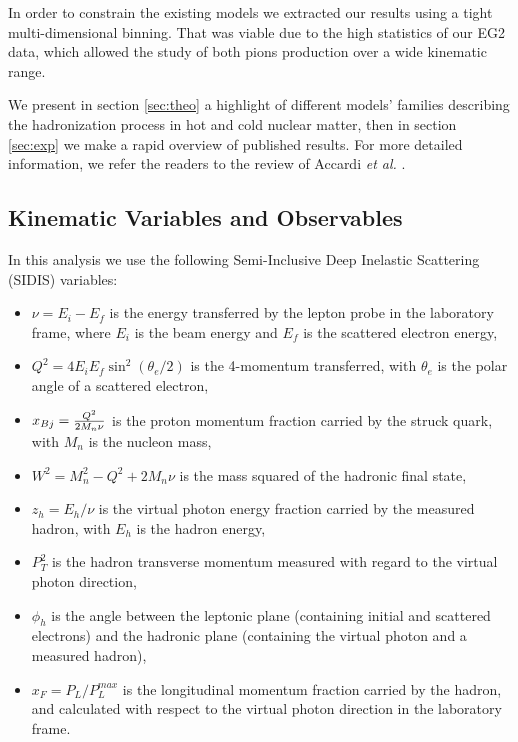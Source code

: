 In order to constrain the existing models we extracted our results using a tight multi-dimensional binning. That was viable due to the high statistics of our EG2 data, which allowed the study of both pions production over a wide kinematic range.

We present in section \ref{sec:theo} a highlight of different models' families describing the hadronization process in hot and cold nuclear matter, then in section \ref{sec:exp} we make a rapid overview of published results. For more detailed information, we refer the readers to the review of Accardi {\it et al.} \cite{Accardi:2009qv}.


\subsection{Kinematic Variables and Observables}

In this analysis we use the following Semi-Inclusive Deep Inelastic Scattering (SIDIS) variables:
\begin{itemize}
 \item $\nu = E_i - E_f$ is the energy transferred by the lepton probe in the laboratory frame, where $E_i$ is the beam energy and $E_f$ is the scattered electron energy,
 \item $Q^2 = 4 E_i E_f \sin ^2(\theta_e / 2)$ is the 4-momentum transferred, with $\theta_e$ is the polar angle of a scattered electron,
 \item $x_{Bj} = {{Q^2} \over {2 M_n \nu}}$ is the proton momentum fraction carried by the struck quark, with $M_n$ is the nucleon mass,
 \item $W^2 = M_n^2 - Q^2 + 2 M_n \nu$ is the mass squared of the hadronic final state,
 \item $z_h = E_h / \nu$ is the virtual photon energy fraction carried by the measured hadron, with $E_h$ is the hadron energy,
 \item $P_T^2$ is the hadron transverse momentum measured with regard to the virtual photon direction,
 \item $\phi_h$ is the angle between the leptonic plane (containing initial and scattered electrons) and the hadronic plane (containing the virtual photon and a measured hadron),
 \item $x_F = P_L/P_L^{max}$ is the longitudinal momentum fraction carried by the hadron, and calculated with respect to the virtual photon direction in the laboratory frame.
\end{itemize}

